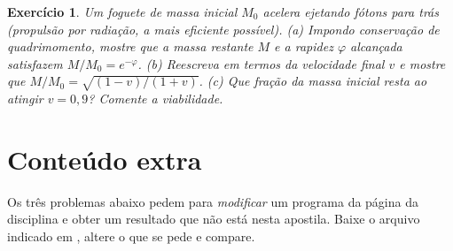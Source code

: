\documentclass[12pt,a4paper,oneside]{book}
\theoremstyle{rgplain}
\newtheorem{exercise}{Exercício}[chapter]
\theoremstyle{rgremark}
\begin{document}
\begin{exercise}
Um foguete de massa inicial $M_0$ acelera ejetando fótons para trás
(propulsão por radiação, a mais eficiente possível). (a) Impondo conservação
de quadrimomento, mostre que a massa restante $M$ e a rapidez $\varphi$
alcançada satisfazem $M/M_0=e^{-\varphi}$. (b) Reescreva em termos da
velocidade final $v$ e mostre que
$M/M_0=\sqrt{(1-v)/(1+v)}$. (c) Que fração da massa inicial resta ao atingir
$v=0{,}9$? Comente a viabilidade.
\end{exercise}


\section{Conteúdo extra}

Os três problemas abaixo pedem para \emph{modificar} um programa da página da disciplina e obter um resultado que não está nesta apostila. Baixe o arquivo indicado em \href{\rgsitecodigos}{\texttt{\rgsitecodigos}}, altere o que se pede e compare.
\end{document}
